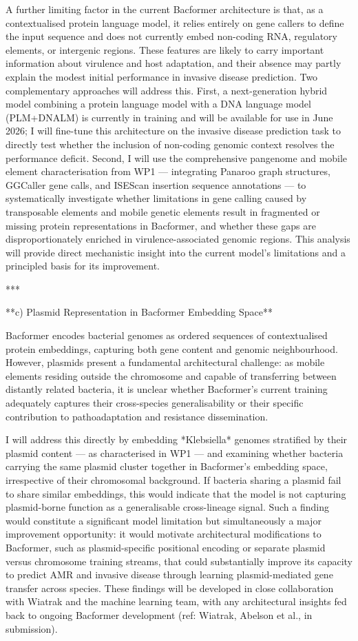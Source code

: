 \documentclass{article}
\begin{document}
A further limiting factor in the current Bacformer architecture is that, as a contextualised protein language model, it relies entirely on gene callers to define the input sequence and does not currently embed non-coding RNA, regulatory elements, or intergenic regions. These features are likely to carry important information about virulence and host adaptation, and their absence may partly explain the modest initial performance in invasive disease prediction. Two complementary approaches will address this. First, a next-generation hybrid model combining a protein language model with a DNA language model (PLM+DNALM) is currently in training and will be available for use in June 2026; I will fine-tune this architecture on the invasive disease prediction task to directly test whether the inclusion of non-coding genomic context resolves the performance deficit. Second, I will use the comprehensive pangenome and mobile element characterisation from WP1 — integrating Panaroo graph structures, GGCaller gene calls, and ISEScan insertion sequence annotations — to systematically investigate whether limitations in gene calling caused by transposable elements and mobile genetic elements result in fragmented or missing protein representations in Bacformer, and whether these gaps are disproportionately enriched in virulence-associated genomic regions. This analysis will provide direct mechanistic insight into the current model's limitations and a principled basis for its improvement.

***

**c) Plasmid Representation in Bacformer Embedding Space**

Bacformer encodes bacterial genomes as ordered sequences of contextualised protein embeddings, capturing both gene content and genomic neighbourhood. However, plasmids present a fundamental architectural challenge: as mobile elements residing outside the chromosome and capable of transferring between distantly related bacteria, it is unclear whether Bacformer's current training adequately captures their cross-species generalisability or their specific contribution to pathoadaptation and resistance dissemination.

I will address this directly by embedding *Klebsiella* genomes stratified by their plasmid content — as characterised in WP1 — and examining whether bacteria carrying the same plasmid cluster together in Bacformer's embedding space, irrespective of their chromosomal background. If bacteria sharing a plasmid fail to share similar embeddings, this would indicate that the model is not capturing plasmid-borne function as a generalisable cross-lineage signal. Such a finding would constitute a significant model limitation but simultaneously a major improvement opportunity: it would motivate architectural modifications to Bacformer, such as plasmid-specific positional encoding or separate plasmid versus chromosome training streams, that could substantially improve its capacity to predict AMR and invasive disease through learning plasmid-mediated gene transfer across species. These findings will be developed in close collaboration with Wiatrak and the machine learning team, with any architectural insights fed back to ongoing Bacformer development (ref: Wiatrak, Abelson et al., in submission).
\end{document}
